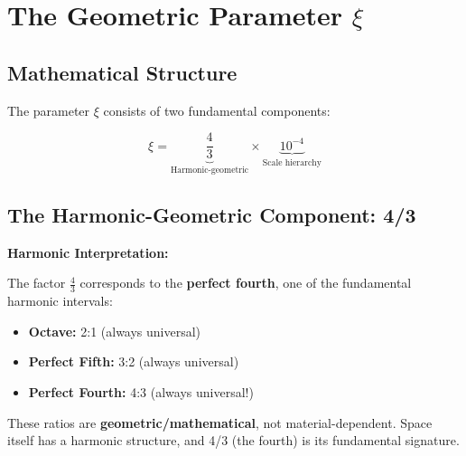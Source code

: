 	\begin{table}[htbp]
		\centering
		
		\caption{Comparison between the Standard Model and T0 Theory}
	\end{table}
	
	\section{The Geometric Parameter $\xi$}
	
	\subsection{Mathematical Structure}
	
	The parameter $\xi$ consists of two fundamental components:
	
	\begin{equation}
		\xi = \underbrace{\frac{4}{3}}_{\text{Harmonic-geometric}} \times \underbrace{10^{-4}}_{\text{Scale hierarchy}}
		\label{eq:xi_components}
	\end{equation}
	
	\subsection{The Harmonic-Geometric Component: 4/3}
	
	\begin{alternative}
		\textbf{Harmonic Interpretation:}
		
		The factor $\frac{4}{3}$ corresponds to the \textbf{perfect fourth}, one of the fundamental harmonic intervals:
		\begin{itemize}
			\item \textbf{Octave:} 2:1 (always universal)
			\item \textbf{Perfect Fifth:} 3:2 (always universal)  
			\item \textbf{Perfect Fourth:} 4:3 (always universal!)
		\end{itemize}
		
		These ratios are \textbf{geometric/mathematical}, not material-dependent. Space itself has a harmonic structure, and 4/3 (the fourth) is its fundamental signature.
	\end{alternative}
	
